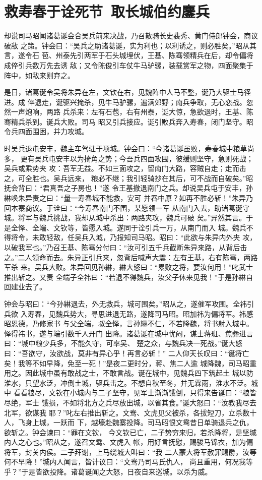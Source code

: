 \chapter{救寿春于诠死节~取长城伯约鏖兵}

却说司马昭闻诸葛诞会合吴兵前来决战，乃召散骑长史裴秀、黄门侍郎钟会，商议破敌
之策。钟会曰：“吴兵之助诸葛诞，实为利也；以利诱之，则必胜矣。”昭从其言，遂令石
苞、州泰先引两军于石头城埋伏，王基、陈骞领精兵在后，却令偏将成倅引兵数万先去诱
敌；又令陈俊引车仗牛马驴骡，装载赏军之物，四面聚集于阵中，如敌来则弃之。

是日，诸葛诞令吴将朱异在左，文钦在右，见魏阵中人马不整，诞乃大驱士马径进。成
倅退走，诞驱兴掩杀，见牛马驴骡，遍满郊野；南兵争取，无心恋战。忽然一声炮响，两路
兵杀来：左有石苞，右有州泰，诞大惊，急欲退时，王基、陈骞精兵杀到。诞兵大败。司马
昭又引兵接应。诞引败兵奔入寿春，闭门坚守。昭令兵四面围困，并力攻城。

时吴兵退屯安丰，魏主车驾驻于项城。钟会曰：“今诸葛诞虽败，寿春城中粮草尚多，
更有吴兵屯安丰以为掎角之势；今吾兵四面攻围，彼缓则坚守，急则死战；吴兵或乘势夹
攻：吾军无益。不如三面攻之，留南门大路，容贼自走；走而击之，可全胜也。吴兵远来，
粮必不继；我引轻骑抄在其后，可不战而自破矣。”昭抚会背曰：“君真吾之子房也！”遂
令王基撤退南门之兵。却说吴兵屯于安丰，孙綝唤朱异责之曰：“量一寿春城不能救，安可
并吞中原？如再不胜必斩！”朱异乃回本寨商议。于诠曰：“今寿春南门不围，某愿领一军
从南门入去，助诸葛诞守城。将军与魏兵挑战，我却从城中杀出：两路夹攻，魏兵可破
矣。”异然其言。于是全怿、全端、文钦等，皆愿入城。遂同于诠引兵一万，从南门而入
城。魏兵不得将令，未敢轻敌，任吴兵入城，乃报知司马昭。昭曰：“此欲与朱异内外夹
攻，以破我军也。”乃召王基、陈骞分付曰：“汝可引五千兵截断朱异来路，从背后击
之。”二人领命而去。朱异正引兵来，忽背后喊声大震：左有王基，右有陈骞，两路军杀
来。吴兵大败。朱异回见孙綝，綝大怒曰：“累败之将，要汝何用！”叱武士推出斩之。又责
全端子全祎曰：“若退不得魏兵，汝父子休来见我！”于是孙綝自回建业去了。

钟会与昭曰：“今孙綝退去，外无救兵，城可围矣。”昭从之，遂催军攻围。全祎引兵欲
入寿春，见魏兵势大，寻思进退无路，遂降司马昭。昭加祎为偏将军。祎感昭恩德，乃修家书
与父全端，叔全怿，言孙綝不仁，不若降魏，将书射入城中。怿得祎书，遂与端引数千人开门
出降。诸葛诞在城中忧闷，谋士蒋班、焦彝进言曰：“城中粮少兵多，不能久守，可率吴、
楚之众，与魏兵决一死战。”诞大怒曰：“吾欲守，汝欲战，莫非有异心乎！再言必斩！”
二人仰天长叹曰：“诞将亡矣！我等不如早降，免至一死！”是夜二更时分，蒋、焦二人逾
城降魏，司马昭重用之。因此城中虽有敢战之士，不敢言战。诞在城中，见魏兵四下筑起土
城以防淮水，只望水泛，冲倒土城，驱兵击之。不想自秋至冬，并无霖雨，淮水不泛。城中
看看粮尽，文钦在小城内与二子坚守，见军士渐渐饿倒，只得来告诞曰：“粮皆尽绝，军士
饿损，不如将北方之兵尽放出城，以省其食。”诞大怒曰：“汝教我尽去北军，欲谋我
耶？”叱左右推出斩之。文鸯、文虎见父被杀，各拔短刀，立杀数十人，飞身上城，一跃而
下，越壕赴魏寨投降。司马昭恨文鸯昔日单骑退兵之仇，欲斩之。钟会谏曰：“罪在文钦，
今文钦已亡，二子势穷来归，若杀降将，是坚城内人之心也。”昭从之，遂召文鸯、文虎入
帐，用好言抚慰，赐骏马锦衣，加为偏将军，封关内侯。二子拜谢，上马绕城大叫曰：“我
二人蒙大将军赦罪赐爵，汝等何不早降！”城内人闻言，皆计议曰：“文鸯乃司马氏仇人，
尚且重用，何况我等乎？”于是皆欲投降。诸葛诞闻之大怒，日夜自来巡城。以杀为威。

